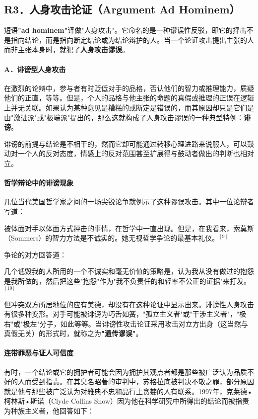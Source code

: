 \subsection{R3．人身攻击论证（Argument Ad Hominem）}

短语\textbf{"ad hominem"}译做"人身攻击"。它命名的是一种谬误性反驳，即它的抨击不是指向结论，而是指向断定结论或为结论辩护的人。当一个论证攻击提出主张的人而非主张本身时，就犯了\textbf{人身攻击谬误}。

\paragraph{A．诽谤型人身攻击}

在激烈的论辩中，参与者有时贬低对手的品格，否认他们的智力或推理能力，质疑他们的正直，等等。但是，个人的品格与他主张的命题的真假或推理的正误在逻辑上并无关联。如果认为某种意见是糟糕的或断定是错误的，而其原因却只是它们是由"激进派"或"极端派"提出的，那么这就构成了人身攻击谬误的一种典型特例：\textbf{诽谤}。

诽谤的前提与结论是不相干的，然而它却可能通过转移心理进路来说服人，可以鼓动对一个人的反对态度，情感上的反对范围甚至扩展得与鼓动者做出的判断也相对立。

\paragraph{哲学辩论中的诽谤现象}
几位当代美国哲学家之间的一场尖锐论争就例示了这种谬误攻击。其中一位论辩者写道：

被体面对手以体面方式抨击的事情，在哲学中一直出现。但是，在我看来，索莫斯（Sommers）的智力方法是不诚实的。她无视哲学争论的最基本礼仪。${ }^{[9]}$

争论的对方回答道：

几个诋毁我的人所用的一个不诚实和毫无价值的策略是，认为我从没有做过的抱怨是我所做的，然后把这些"抱怨"作为"我不负责任的和轻率不公正的证据"来打发。${ }^{[10]}$

但冲突双方所居地位的应有美德，却没有在这种论证中显示出来。诽谤性人身攻击有很多种变形。对手可能被诽谤为巧舌如簧，"孤立主义者"或"干涉主义者"，"极右"或"极左"分子，如此等等。当诽谤性攻击论证采用攻击对立方出身（这当然与真假无关）的形式时，就称之为\textbf{"遗传谬误"}。

\paragraph{连带罪恶与证人可信度}
有时，一个结论或它的拥护者可能会因为拥护其观点者都是那些被广泛认为品质不好的人而受到指责。在其臭名昭著的审判中，苏格拉底被判决不敬之罪，部分原因就是他与那些被广泛认为对雅典不忠和品行上贪婪的人有联系。1997年，克莱德•柯林斯•斯诺（Clyde Collins Snow）因为他在科学研究中所得出的结论而被指责为种族主义者，他回答如下：

